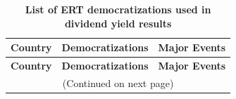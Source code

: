 \footnotesize
\begin{longtable}{lcc}
	\caption{\textbf{List of ERT democratizations used in dividend yield results}}  \\ 
	\hline 
	\toprule 
	\textbf{Country} & \textbf{Democratizations} & \textbf{Major Events}  \\ \hline
	\midrule 
	\endfirsthead 
	\toprule 
	\textbf{Country} & \textbf{Democratizations} & \textbf{Major Events}  \\ 
	\midrule 
	\endhead 
	\midrule 
	\multicolumn{3}{c}{\footnotesize(Continued on next page)} 
	\endfoot 
	\bottomrule 
	\endlastfoot 
	\label{table:fastDem}
		
\end{longtable}